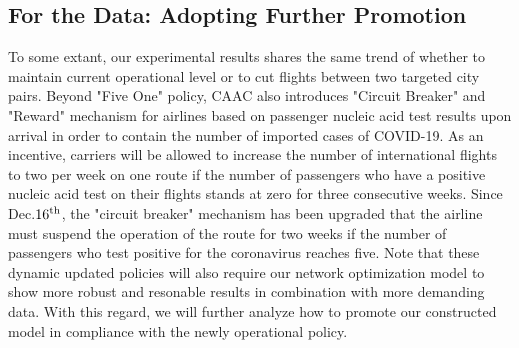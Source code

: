 \subsection{For the Data: Adopting Further Promotion}
To some extant, our experimental results shares the same trend of whether to maintain current operational level or to cut flights between two targeted city pairs. Beyond "Five One" policy, CAAC also introduces "Circuit Breaker" and "Reward" mechanism for airlines based on passenger nucleic acid test results upon arrival in order to contain the number of imported cases of COVID-19. As an incentive, carriers will be allowed to increase the number of international flights to two per week on one route if the number of passengers who have a positive nucleic acid test on their flights stands at zero for three consecutive weeks. Since Dec.$16^{\rm th}$, the "circuit breaker" mechanism has been upgraded that the airline must suspend the operation of the route for two weeks if the number of passengers who test positive for the coronavirus reaches five. Note that these dynamic updated policies will also require our network optimization model to show more robust and resonable results in combination with more demanding data. With this regard, we will further analyze how to promote our constructed model in compliance with the newly operational policy.



